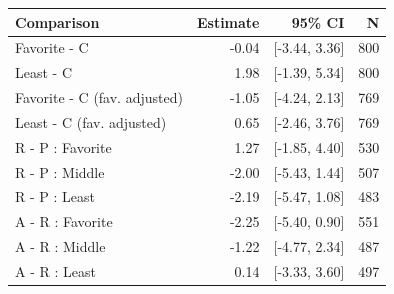 \begin{tabular}{@{}p{6.0cm}rrr@{}}
\toprule
Comparison & Estimate & 95\% CI & N \\
\midrule
Favorite - C & -0.04 & [-3.44, 3.36] & 800 \\
Least - C & 1.98 & [-1.39, 5.34] & 800 \\
Favorite - C (fav. adjusted) & -1.05 & [-4.24, 2.13] & 769 \\
Least - C (fav. adjusted) & 0.65 & [-2.46, 3.76] & 769 \\
R - P : Favorite & 1.27 & [-1.85, 4.40] & 530 \\
R - P : Middle & -2.00 & [-5.43, 1.44] & 507 \\
R - P : Least & -2.19 & [-5.47, 1.08] & 483 \\
A - R : Favorite & -2.25 & [-5.40, 0.90] & 551 \\
A - R : Middle & -1.22 & [-4.77, 2.34] & 487 \\
A - R : Least & 0.14 & [-3.33, 3.60] & 497 \\
\bottomrule
\end{tabular}
